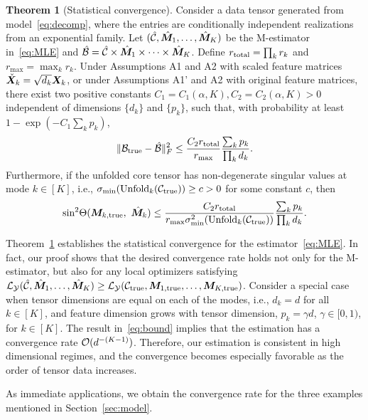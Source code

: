 \documentclass[12pt]{article}
\theoremstyle{definition}
\newtheorem{thm}{Theorem}[section]
\theoremstyle{definition}
\begin{document}
 
\begin{thm}[Statistical convergence]\label{thm:main}
Consider a data tensor generated from model~\eqref{eq:decomp}, where the entries are conditionally independent realizations from an exponential family. Let $(\hat {\mathcal{C}}, \hat {\bm M}_1,\ldots,\hat {\bm M}_K)$ be the M-estimator in~\eqref{eq:MLE} and $\hat {\mathcal{B}}=\hat {\mathcal{C}}\times \hat {\bm M}_1\times\cdots \times \hat {\bm M}_K$. Define $r_\textup{total}=\prod_k r_k$ and $r_{\max}=\max_k r_k$. Under Assumptions A1 and A2 with scaled feature matrices $\check {\bm X}_k= \sqrt{d_k}\bm X_k$, or under Assumptions A1' and A2 with original feature matrices, there exist two positive constants $C_1=C_1(\alpha,K), C_2=C_2(\alpha, K)>0$ independent of dimensions $\{d_k\}$ and $\{p_k\}$, such that, with probability at least $1-\exp(-C_1\sum_k p_k)$, 
\begin{equation}\label{eq:bound}
    \lVert\mathcal{B}_{\textup{true}}- \hat {\mathcal{B}}\rVert_F^2\leq \frac{ C_{2} r_{\textup{total}}}{r_{\max}}\frac{\sum_k p_k}{\prod_k d_k}.
\end{equation}
Furthermore, if the unfolded core tensor has non-degenerate singular values at mode $k\in[K]$, i.e., $\sigma_{\min}(\textup{Unfold}_k(\mathcal{C}_\textup{true})) \geq c>0$ for some constant $c$, then
\begin{equation}\label{eq:sinebound}
\textup{sin}^2 \Theta(\bm M_{k,\textup{true}},\ \hat {\bm M}_k) \leq  \frac{ C_{2}r_{\textup{total}}}{ r_{\max}\sigma^2_{\min}(\textup{Unfold}_k(\mathcal{C}_\textup{true}))}\frac{\sum_k p_k}{\prod_k d_k}.
\end{equation}
\end{thm}

Theorem~\ref{thm:main} establishes the statistical convergence for the estimator~\eqref{eq:MLE}. In fact, our proof shows that the desired convergence rate holds not only for the M-estimator, but also for any local optimizers satisfying $\mathcal{L}_{\mathcal{Y}}(\hat {\mathcal{C}}, \hat {\bm M}_1,\ldots,\hat {\bm M}_K) \geq \mathcal{L}_{\mathcal{Y}}(\mathcal{C}_{\textup{true}},  \bm M_{1,\textup{true}},\ldots,\bm M_{K,\textup{true}})$. Consider a special case when tensor dimensions are equal on each of the modes, i.e., $d_k=d$ for all $k\in[K]$, and feature dimension grows with tensor dimension, $p_k=\gamma d$, $\gamma\in [0,1)$, for $k\in[K]$. The result in~\eqref{eq:bound} implies that the estimation has a convergence rate $\mathcal{O}(d^{-(K-1)})$. Therefore, our estimation is consistent in high dimensional regimes, and the convergence becomes especially favorable as the order of tensor data increases. 

As immediate applications, we obtain the convergence rate for the three examples mentioned in Section~\ref{sec:model}.
\end{document}
